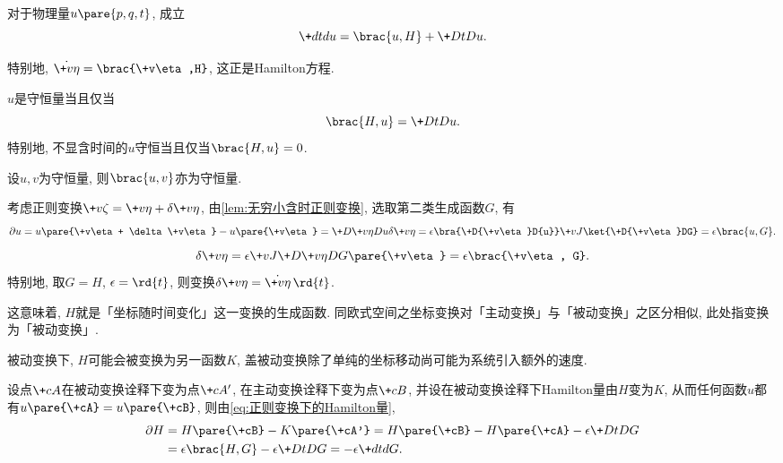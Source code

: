 \documentclass[../TheoreticalMechanics.tex]{subfiles}
\begin{document}
\begin{finale}
    \begin{theorem}[Poisson括号与变化率]
        对于物理量$u\pare{p,q,t}$, 成立
        \[ \+dtdu = \brac{u,H} + \+DtDu. \]
    \end{theorem}
\end{finale}
\begin{remark}
    特别地, $\dot{\+v\eta} = \brac{\+v\eta,H}$, 这正是Hamilton方程.
\end{remark}
\begin{corollary}[守恒量条件]
    $u$是守恒量当且仅当
    \[ \brac{H,u} = \+DtDu. \]
    特别地, 不显含时间的$u$守恒当且仅当$\brac{H,u} = 0$.
\end{corollary}
\begin{corollary}[Poisson定理]
    \label{coll:Poisson定理}
    设$u,v$为守恒量, 则$\brac{u,v}$亦为守恒量.
\end{corollary}
\begin{lemma}[无穷小变换与Poisson括号]
    考虑正则变换$\+v\zeta = \+v\eta + \delta\+v\eta$, 由\cref{lem:无穷小含时正则变换}, 选取第二类生成函数$G$, 有
    \[ \partial u = u\pare{\+v\eta + \delta\+v\eta} - u\pare{\+v\eta} = \+D{\+v\eta}D{u}\delta\+v\eta = \epsilon\bra{\+D{\+v\eta}D{u}}\+vJ\ket{\+D{\+v\eta}DG} = \epsilon\brac{u,G}. \]
    \[ \delta\+v\eta = \epsilon\+vJ\+D{\+v\eta}D{G\pare{\+v\eta}} = \epsilon\brac{\+v\eta, G}. \]
    特别地, 取$G=H$, $\epsilon = \rd{t}$, 则变换$\delta\+v\eta = \dot{\+v\eta}\,\rd{t}$.
\end{lemma}
\begin{remark}
    这意味着, $H$就是「坐标随时间变化」这一变换的生成函数. 同欧式空间之坐标变换对「主动变换」与「被动变换」之区分相似, 此处指变换为「被动变换」.
\end{remark}
\begin{pitfall}
    被动变换下, $H$可能会被变换为另一函数$K$, 盖被动变换除了单纯的坐标移动尚可能为系统引入额外的速度.
\end{pitfall}
\begin{lemma}[Hamilton量的变换与Poisson括号]
    设点$\+cA$在被动变换诠释下变为点$\+cA'$, 在主动变换诠释下变为点$\+cB$, 并设在被动变换诠释下Hamilton量由$H$变为$K$, 从而任何函数$u$都有$u\pare{\+cA} = u\pare{\+cB}$, 则由\eqref{eq:正则变换下的Hamilton量},
    \begin{align*}
        \partial H &= H\pare{\+cB} - K\pare{\+cA'} = H\pare{\+cB} - H\pare{\+cA} - \epsilon\+DtDG \\
        &= \epsilon\brac{H,G} - \epsilon\+DtDG = -\epsilon\+dtdG. 
    \end{align*}
\end{lemma}
\end{document}

